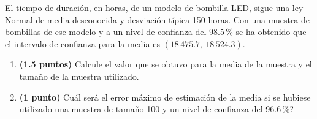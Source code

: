 
El tiempo de duración, en horas, de un modelo de bombilla LED, sigue una ley
Normal de media desconocida y desviación típica 150 horas. Con una muestra de
bombillas de ese modelo y a un nivel de confianza del 98.5\,\% se ha obtenido
que el intervalo de confianza para la media es $(18\,475.7,\ 18\,524.3)$.
\begin{enumerate}[label=\alph*)]
  \item \textbf{(1.5 puntos)} Calcule el valor que se obtuvo para la media
  de la muestra y el tamaño de la muestra utilizado.
  \item \textbf{(1 punto)} \textquestiondown{}Cuál será el error máximo de
  estimación de la media si se hubiese utilizado una muestra de tamaño 100
  y un nivel de confianza del 96.6\,\%?
\end{enumerate}
